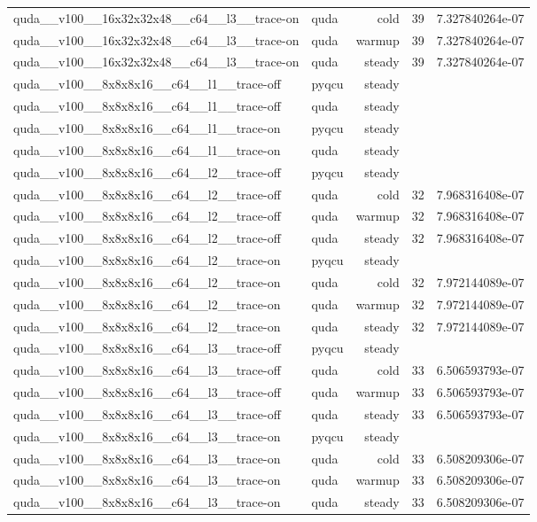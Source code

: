 \begin{table}[htbp]
\begin{tabular}{@{}llrrr@{}}
quda\_\_v100\_\_16x32x32x48\_\_c64\_\_l3\_\_trace-on & quda & cold & 39 & 7.327840264e-07 \\
quda\_\_v100\_\_16x32x32x48\_\_c64\_\_l3\_\_trace-on & quda & warmup & 39 & 7.327840264e-07 \\
quda\_\_v100\_\_16x32x32x48\_\_c64\_\_l3\_\_trace-on & quda & steady & 39 & 7.327840264e-07 \\
quda\_\_v100\_\_8x8x8x16\_\_c64\_\_l1\_\_trace-off & pyqcu & steady &  &  \\
quda\_\_v100\_\_8x8x8x16\_\_c64\_\_l1\_\_trace-off & quda & steady &  &  \\
quda\_\_v100\_\_8x8x8x16\_\_c64\_\_l1\_\_trace-on & pyqcu & steady &  &  \\
quda\_\_v100\_\_8x8x8x16\_\_c64\_\_l1\_\_trace-on & quda & steady &  &  \\
quda\_\_v100\_\_8x8x8x16\_\_c64\_\_l2\_\_trace-off & pyqcu & steady &  &  \\
quda\_\_v100\_\_8x8x8x16\_\_c64\_\_l2\_\_trace-off & quda & cold & 32 & 7.968316408e-07 \\
quda\_\_v100\_\_8x8x8x16\_\_c64\_\_l2\_\_trace-off & quda & warmup & 32 & 7.968316408e-07 \\
quda\_\_v100\_\_8x8x8x16\_\_c64\_\_l2\_\_trace-off & quda & steady & 32 & 7.968316408e-07 \\
quda\_\_v100\_\_8x8x8x16\_\_c64\_\_l2\_\_trace-on & pyqcu & steady &  &  \\
quda\_\_v100\_\_8x8x8x16\_\_c64\_\_l2\_\_trace-on & quda & cold & 32 & 7.972144089e-07 \\
quda\_\_v100\_\_8x8x8x16\_\_c64\_\_l2\_\_trace-on & quda & warmup & 32 & 7.972144089e-07 \\
quda\_\_v100\_\_8x8x8x16\_\_c64\_\_l2\_\_trace-on & quda & steady & 32 & 7.972144089e-07 \\
quda\_\_v100\_\_8x8x8x16\_\_c64\_\_l3\_\_trace-off & pyqcu & steady &  &  \\
quda\_\_v100\_\_8x8x8x16\_\_c64\_\_l3\_\_trace-off & quda & cold & 33 & 6.506593793e-07 \\
quda\_\_v100\_\_8x8x8x16\_\_c64\_\_l3\_\_trace-off & quda & warmup & 33 & 6.506593793e-07 \\
quda\_\_v100\_\_8x8x8x16\_\_c64\_\_l3\_\_trace-off & quda & steady & 33 & 6.506593793e-07 \\
quda\_\_v100\_\_8x8x8x16\_\_c64\_\_l3\_\_trace-on & pyqcu & steady &  &  \\
quda\_\_v100\_\_8x8x8x16\_\_c64\_\_l3\_\_trace-on & quda & cold & 33 & 6.508209306e-07 \\
quda\_\_v100\_\_8x8x8x16\_\_c64\_\_l3\_\_trace-on & quda & warmup & 33 & 6.508209306e-07 \\
quda\_\_v100\_\_8x8x8x16\_\_c64\_\_l3\_\_trace-on & quda & steady & 33 & 6.508209306e-07 \\
\bottomrule
\end{tabular}
\end{table}

